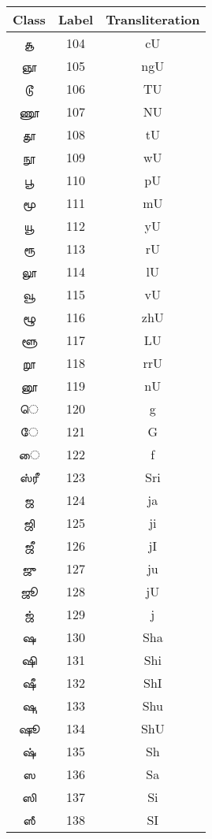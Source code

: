 \documentclass[a4paper,10pt]{article}
\begin{document}
\begin{table}[!t]\center
\begin{tabular}{ccc}
\toprule
\textbf{Class} & \textbf{Label} & \textbf{Transliteration}  \\
\midrule

\t{ சூ } & 104 & cU \\

\t{ ஞூ } & 105 & ngU \\



\t{ டூ } & 106 & TU \\
\t{ ணூ } & 107 & NU \\
\t{ தூ } & 108 & tU \\
\t{ நூ } & 109 & wU \\
\t{ பூ } & 110 & pU \\
\t{ மூ } & 111 & mU \\
\t{ யூ } & 112 & yU \\
\t{ ரூ } & 113 & rU \\
\t{ லூ } & 114 & lU \\
\t{ வூ } & 115 & vU \\
\t{ ழூ } & 116 & zhU \\
\t{ ளூ } & 117 & LU \\
\t{ றூ } & 118 & rrU \\
\t{ னூ } & 119 & nU \\
\t{ ெ } & 120 & g \\
\t{ ே } & 121 & G \\
\t{ ை } & 122 & f \\
\t{ ஸ்ரீ } & 123 & Sri \\
\t{ ஜ } & 124 & ja \\
\t{ ஜி } & 125 & ji \\
\t{ ஜீ } & 126 & jI \\
\t{ ஜு } & 127 & ju \\
\t{ ஜூ } & 128 & jU \\
\t{ ஜ் } & 129 & j \\
\t{ ஷ } & 130 & Sha \\
\t{ ஷி } & 131 & Shi \\
\t{ ஷீ } & 132 & ShI \\
\t{ ஷு } & 133 & Shu \\
\t{ ஷூ } & 134 & ShU \\
\t{ ஷ் } & 135 & Sh \\
\t{ ஸ } & 136 & Sa \\
\t{ ஸி } & 137 & Si \\
\t{ ஸீ } & 138 & SI \\

\end{tabular}
\end{table}
\end{document}
